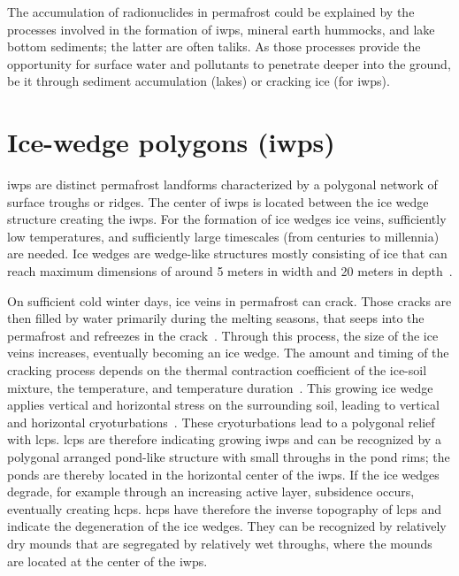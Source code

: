 The accumulation of radionuclides in permafrost could be explained by the processes involved in the formation of \glspl{iwp}, mineral earth hummocks, and lake bottom sediments; the latter are often taliks. As those processes provide the opportunity for surface water and pollutants to penetrate deeper into the ground, be it through sediment accumulation (lakes) or cracking ice (for \glspl{iwp}).\@

\section[Ice-wedge polygons (IWPs)]{Ice-wedge polygons (\glspl{iwp})}
\glspl{iwp} are distinct permafrost landforms characterized by a polygonal network of surface troughs or ridges. 
The center of \glspl{iwp} is located between the ice wedge structure creating the \glspl{iwp}. 
For the formation of ice wedges ice veins, sufficiently low temperatures, and sufficiently large timescales (from centuries to millennia) are needed. 
Ice wedges are wedge-like structures mostly consisting of ice that can reach maximum dimensions of around 5 meters in width and 20 meters in depth~\citep{ulrichQuantifyingWedgeIceVolumes2014}.

On sufficient cold winter days, ice veins in permafrost can crack. 
Those cracks are then filled by water primarily during the melting seasons, that seeps into the permafrost and refreezes in the crack~\citep{fortierLateHoloceneSyngenetic2004,liljedahlPanArcticIcewedgeDegradation2016}. 
Through this process, the size of the ice veins increases, eventually becoming an ice wedge. The amount and timing of the cracking process depends on the thermal contraction coefficient of the ice-soil mixture, the temperature, and temperature duration~\citep{fortierLateHoloceneSyngenetic2004}. 
This growing ice wedge applies vertical and horizontal stress on the surrounding soil, leading to vertical and horizontal cryoturbations~\citep{fortierLateHoloceneSyngenetic2004,liljedahlPanArcticIcewedgeDegradation2016}. These cryoturbations lead to a polygonal relief with \glspl{lcp}. 
\glspl{lcp} are therefore indicating growing \glspl{iwp} and can be recognized by a polygonal arranged pond-like structure with small throughs in the pond rims; the ponds are thereby located in the horizontal center of the \glspl{iwp}.\@
If the ice wedges degrade, for example through an increasing active layer, subsidence occurs, eventually creating \glspl{hcp}. 
\glspl{hcp} have therefore the inverse topography of \glspl{lcp} and indicate the degeneration of the ice wedges. They can be recognized by relatively dry mounds that are segregated by relatively wet throughs, where the mounds are located at the center of the \glspl{iwp}.\@

